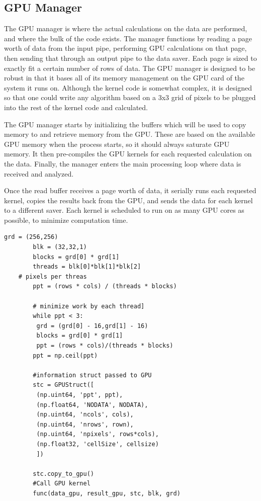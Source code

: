 \documentclass[journal]{IEEEtran}
\begin{document}
    \subsection{GPU Manager}
    The GPU manager is where the actual calculations on the data are performed,
    and where the bulk of the code exists. The manager functions by reading a
    page worth of data from the input pipe, performing GPU calculations on that
    page, then sending that through an output pipe to the data saver. Each page
    is sized to exactly fit a certain number of rows of data. The GPU manager
    is designed to be robust in that it bases all of its memory management on
    the GPU card of the system it runs on. Although the kernel code is somewhat
    complex, it is designed so that one could write any algorithm based on a
    3x3 grid of pixels to be plugged into the rest of the kernel code and calculated.

    The GPU manager starts by initializing the buffers which will be used to
    copy memory to and retrieve memory from the GPU. These are based on the
    available GPU memory when the process starts, so it should always saturate
    GPU memory. It then pre-compiles the GPU kernels for each requested
    calculation on the data. Finally, the manager enters the main processing loop
    where data is received and analyzed.

    Once the read buffer receives a page worth of data, it serially runs each
    requested kernel, copies the results back from the GPU, and sends the data
    for each kernel to a different saver. Each kernel is scheduled to run on
    as many GPU cores as possible, to minimize computation time.

    \begin{Verbatim}[frame=single, gobble=8]
        grd = (256,256)
        blk = (32,32,1)
        blocks = grd[0] * grd[1]
        threads = blk[0]*blk[1]*blk[2]
	# pixels per threas
        ppt = (rows * cols) / (threads * blocks)    

        # minimize work by each thread]
        while ppt < 3:
         grd = (grd[0] - 16,grd[1] - 16)
         blocks = grd[0] * grd[1]
         ppt = (rows * cols)/(threads * blocks)
        ppt = np.ceil(ppt)   
        
        #information struct passed to GPU
        stc = GPUStruct([
         (np.uint64, 'ppt', ppt),
         (np.float64, 'NODATA', NODATA),
         (np.uint64, 'ncols', cols),
         (np.uint64, 'nrows', rown),
         (np.uint64, 'npixels', rows*cols),
         (np.float32, 'cellSize', cellsize)
         ])

        stc.copy_to_gpu()
        #Call GPU kernel
        func(data_gpu, result_gpu, stc, blk, grd)
\end{Verbatim}
\end{document}
